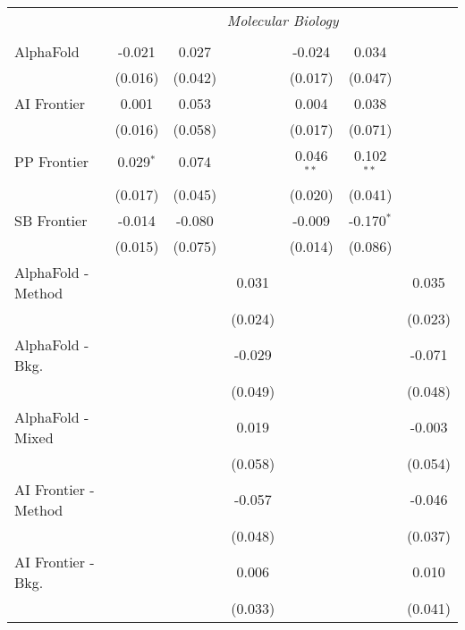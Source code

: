 \begin{tabular}{lcccccc}
 & \multicolumn{6}{c}{\textit{Molecular Biology}} \\ \\
   AlphaFold            & -0.021      & 0.027   &             & -0.024       & 0.034        &   \\   
                        & (0.016)     & (0.042) &             & (0.017)      & (0.047)      &   \\   
   AI Frontier          & 0.001       & 0.053   &             & 0.004        & 0.038        &   \\   
                        & (0.016)     & (0.058) &             & (0.017)      & (0.071)      &   \\   
   PP Frontier          & 0.029$^{*}$ & 0.074   &             & 0.046$^{**}$ & 0.102$^{**}$ &   \\   
                        & (0.017)     & (0.045) &             & (0.020)      & (0.041)      &   \\   
   SB Frontier          & -0.014      & -0.080  &             & -0.009       & -0.170$^{*}$ &   \\   
                        & (0.015)     & (0.075) &             & (0.014)      & (0.086)      &   \\   
   AlphaFold - Method   &             &         & 0.031       &              &              & 0.035\\   
                        &             &         & (0.024)     &              &              & (0.023)\\   
   AlphaFold - Bkg.     &             &         & -0.029      &              &              & -0.071\\   
                        &             &         & (0.049)     &              &              & (0.048)\\   
   AlphaFold - Mixed    &             &         & 0.019       &              &              & -0.003\\   
                        &             &         & (0.058)     &              &              & (0.054)\\   
   AI Frontier - Method &             &         & -0.057      &              &              & -0.046\\   
                        &             &         & (0.048)     &              &              & (0.037)\\   
   AI Frontier - Bkg.   &             &         & 0.006       &              &              & 0.010\\   
                        &             &         & (0.033)     &              &              & (0.041)\\   

\end{tabular}
